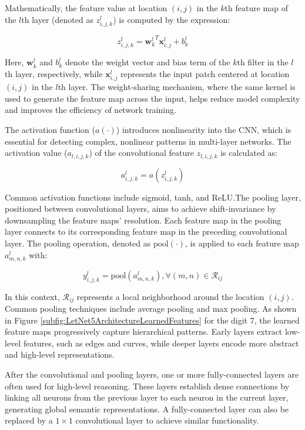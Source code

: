 Mathematically, the feature value at location $(i, j)$ in the $k$th feature map of the $l$th layer (denoted as $z^l_{i,j,k}$) is computed by the expression:

\begin{equation}
	z^l_{i,j,k} = {\mathbf{w}^l_k}^T \mathbf{x}^l_{i,j} + b^l_k
\end{equation}

Here, $\mathbf{w}^l_k$ and $b^l_k$ denote the weight vector and bias term of the $k$th filter in the $l$th layer, respectively, while $\mathbf{x}^l_{i,j}$ represents the input patch centered at location $(i, j)$ in the $l$th layer. The weight-sharing mechanism, where the same kernel is used to generate the feature map across the input, helps reduce model complexity and improves the efficiency of network training.

The activation function ($a(\cdot)$) introduces nonlinearity into the CNN, which is essential for detecting complex, nonlinear patterns in multi-layer networks. The activation value ($a_{l,i,j,k}$) of the convolutional feature $z_{l,i,j,k}$ is calculated as:

\begin{equation}
	a^l_{i,j,k} = a(z^l_{i,j,k})
\end{equation}

Common activation functions include sigmoid, tanh, and ReLU.The pooling layer, positioned between convolutional layers, aims to achieve shift-invariance by downsampling the feature maps' resolution. Each feature map in the pooling layer connects to its corresponding feature map in the preceding convolutional layer. The pooling operation, denoted as $\mathrm{pool}(\cdot)$, is applied to each feature map $a^l_{m,n,k}$ with:

\begin{equation}
	y^l_{i,j,k} = \mathrm{pool}(a^l_{m,n,k}), \forall (m, n) \in \mathcal{R}_{ij}
\end{equation}

In this context, $\mathcal{R}_{ij}$ represents a local neighborhood around the location $(i, j)$. Common pooling techniques include average pooling and max pooling. As shown in Figure \ref{subfig:LetNet5ArchitectureLearnedFeatures} for the digit 7, the learned feature maps progressively capture hierarchical patterns. Early layers extract low-level features, such as edges and curves, while deeper layers encode more abstract and high-level representations.

After the convolutional and pooling layers, one or more fully-connected layers are often used for high-level reasoning. These layers establish dense connections by linking all neurons from the previous layer to each neuron in the current layer, generating global semantic representations. A fully-connected layer can also be replaced by a $1 \times 1$ convolutional layer to achieve similar functionality.

